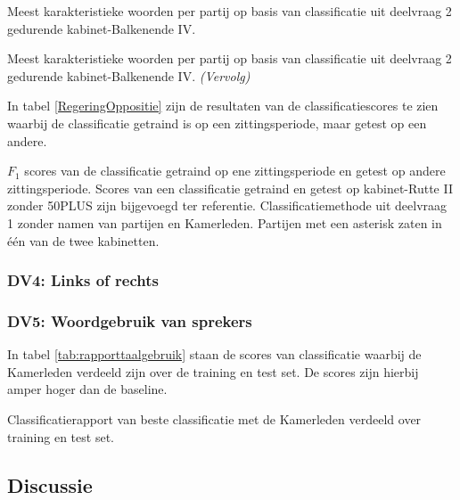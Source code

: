 \begin{table}[H] 
\caption{Meest karakteristieke woorden per partij op basis van classificatie uit deelvraag 2 gedurende kabinet-Balkenende IV.} 
\label{tab:WoordenBalkenende4} 
\centering
\hspace*{-1in}
 
\end{table} 
\addtocounter{table}{-1} 
\begin{table}[H] 
\caption{Meest karakteristieke woorden per partij op basis van classificatie uit deelvraag 2 gedurende kabinet-Balkenende IV. \emph{(Vervolg)}} 
\centering
\hspace*{-0.6in}
 
\end{table}
In tabel \ref{RegeringOppositie} zijn de resultaten van de classificatiescores te zien waarbij de classificatie getraind is op een zittingsperiode, maar getest op een andere. \par
\begin{table}[H]
\caption{$F_1$ scores van de classificatie getraind op ene zittingsperiode en getest op andere zittingsperiode. Scores van een classificatie getraind en getest op kabinet-Rutte II zonder 50PLUS zijn bijgevoegd ter referentie. Classificatiemethode uit deelvraag 1 zonder namen van partijen en Kamerleden. Partijen met een asterisk zaten in één van de twee kabinetten.}
\centering
\label{RegeringOppositie}

\end{table}


\subsubsection{DV4: Links of rechts}

\subsubsection{DV5: Woordgebruik van sprekers}
In tabel \ref{tab:rapporttaalgebruik} staan de scores van classificatie waarbij de Kamerleden verdeeld zijn over de training en test set. De scores zijn hierbij amper hoger dan de baseline.
\begin{table}[H]
\caption{Classificatierapport van beste classificatie met de Kamerleden verdeeld over training en test set.}
\label{tab:rapporttaalgebruik}
\centering

\end{table}

\subsection{Discussie}

